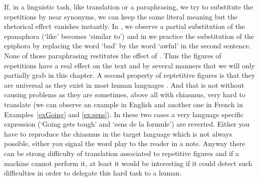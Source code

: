 If, in a linguistic task, like translation or a paraphrasing, we try to substitute the repetitions by near synonyms, we can keep the same literal meaning but the rhetorical effect vanishes instantly. In , we observe a partial substitution of the epanaphora (`like' becomes `similar to') and in  we practice the substitution of the epiphora by replacing the word `bad' by the word `awful' in the second sentence.
%
None of those paraphrasing restitutes the effect of . Thus the figures of repetitions have a real effect on the text and by several manners that we will only partially grab in this chapter. %
A second property of reptetitive figures is that they are universal as they exist in most human languages \citep{Welch1981}. And that is not without causing problems as they are sometimes, above all with chiasmus, very hard to translate (we can observe an example in English and another one in French in Examples~\ref{exGoing} and \ref{ex:sens}).%
%
%
%
In these two cases a very language specific expression (`Going gets tough' and `sens de la formule') are reverted. Either you have to reproduce the chiasmus in the target language which is not always possible, either you signal the word play to the reader in a note. Anyway there can be strong difficulty of translation associated to repetitive figures and if a machine cannot perform it, at least it would be interesting if it could detect such difficulties in order to delegate this hard task to a human.
